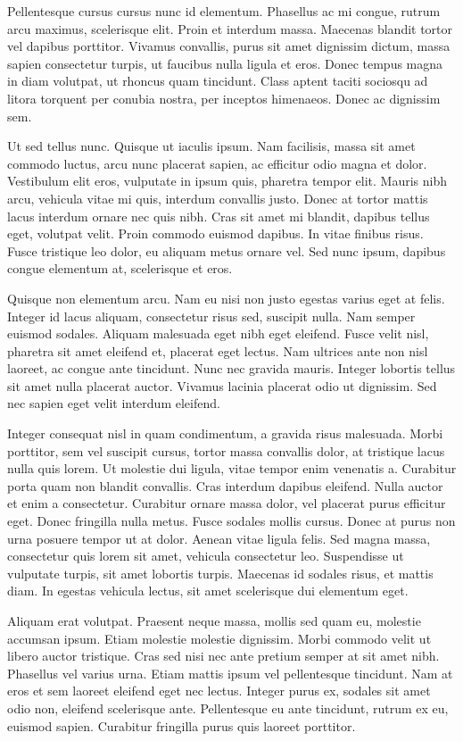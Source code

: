 \documentclass{homework}
\begin{document}
Pellentesque cursus cursus nunc id elementum. Phasellus ac mi congue, rutrum arcu maximus, scelerisque elit. Proin et interdum massa. Maecenas blandit tortor vel dapibus porttitor. Vivamus convallis, purus sit amet dignissim dictum, massa sapien consectetur turpis, ut faucibus nulla ligula et eros. Donec tempus magna in diam volutpat, ut rhoncus quam tincidunt. Class aptent taciti sociosqu ad litora torquent per conubia nostra, per inceptos himenaeos. Donec ac dignissim sem.

Ut sed tellus nunc. Quisque ut iaculis ipsum. Nam facilisis, massa sit amet commodo luctus, arcu nunc placerat sapien, ac efficitur odio magna et dolor. Vestibulum elit eros, vulputate in ipsum quis, pharetra tempor elit. Mauris nibh arcu, vehicula vitae mi quis, interdum convallis justo. Donec at tortor mattis lacus interdum ornare nec quis nibh. Cras sit amet mi blandit, dapibus tellus eget, volutpat velit. Proin commodo euismod dapibus. In vitae finibus risus. Fusce tristique leo dolor, eu aliquam metus ornare vel. Sed nunc ipsum, dapibus congue elementum at, scelerisque et eros.

Quisque non elementum arcu. Nam eu nisi non justo egestas varius eget at felis. Integer id lacus aliquam, consectetur risus sed, suscipit nulla. Nam semper euismod sodales. Aliquam malesuada eget nibh eget eleifend. Fusce velit nisl, pharetra sit amet eleifend et, placerat eget lectus. Nam ultrices ante non nisl laoreet, ac congue ante tincidunt. Nunc nec gravida mauris. Integer lobortis tellus sit amet nulla placerat auctor. Vivamus lacinia placerat odio ut dignissim. Sed nec sapien eget velit interdum eleifend.

Integer consequat nisl in quam condimentum, a gravida risus malesuada. Morbi porttitor, sem vel suscipit cursus, tortor massa convallis dolor, at tristique lacus nulla quis lorem. Ut molestie dui ligula, vitae tempor enim venenatis a. Curabitur porta quam non blandit convallis. Cras interdum dapibus eleifend. Nulla auctor et enim a consectetur. Curabitur ornare massa dolor, vel placerat purus efficitur eget. Donec fringilla nulla metus. Fusce sodales mollis cursus. Donec at purus non urna posuere tempor ut at dolor. Aenean vitae ligula felis. Sed magna massa, consectetur quis lorem sit amet, vehicula consectetur leo. Suspendisse ut vulputate turpis, sit amet lobortis turpis. Maecenas id sodales risus, et mattis diam. In egestas vehicula lectus, sit amet scelerisque dui elementum eget.

Aliquam erat volutpat. Praesent neque massa, mollis sed quam eu, molestie accumsan ipsum. Etiam molestie molestie dignissim. Morbi commodo velit ut libero auctor tristique. Cras sed nisi nec ante pretium semper at sit amet nibh. Phasellus vel varius urna. Etiam mattis ipsum vel pellentesque tincidunt. Nam at eros et sem laoreet eleifend eget nec lectus. Integer purus ex, sodales sit amet odio non, eleifend scelerisque ante. Pellentesque eu ante tincidunt, rutrum ex eu, euismod sapien. Curabitur fringilla purus quis laoreet porttitor.
\end{document}
